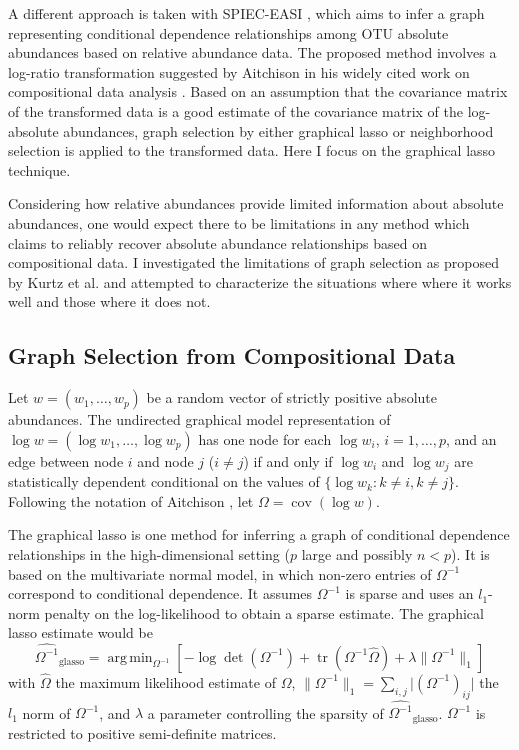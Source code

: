 \documentclass[10pt]{article}
\newcommand{\cov}{\operatorname{cov}}
\DeclareMathOperator*{\argmin}{arg\,min}
\DeclareMathOperator{\tr}{tr}
\begin{document}
A different approach is taken with SPIEC-EASI \cite{kurtz}, which aims to infer a graph representing conditional dependence relationships among OTU absolute abundances based on relative abundance data. The proposed method involves a log-ratio transformation suggested by Aitchison in his widely cited work on compositional data analysis \citeyear{aitchison}. Based on an assumption that the covariance matrix of the transformed data is a good estimate of the covariance matrix of the log-absolute abundances, graph selection by either graphical lasso or neighborhood selection is applied to the transformed data. Here I focus on the graphical lasso technique.

Considering how relative abundances provide limited information about absolute abundances, one would expect there to be limitations in any method which claims to reliably recover absolute abundance relationships based on compositional data. I investigated the limitations of graph selection as proposed by Kurtz et al. \citeyear{kurtz} and attempted to characterize the situations where where it works well and those where it does not.

\subsection*{Graph Selection from Compositional Data}

Let $w = (w_1, \dots, w_p)$ be a random vector of strictly positive absolute abundances. The undirected graphical model representation of $\log w = (\log w_1, \dots, \log w_p)$ has one node for each $\log w_i$, $i = 1, \dots, p$, and an edge between node $i$ and node $j$ ($i \ne j$) if and only if $\log w_i$ and $\log w_j$ are statistically dependent conditional on the values of $\{\log w_k : k \ne i, k \ne j\}$. Following the notation of Aitchison \citeyear{aitchison}, let $\Omega = \cov(\log w)$.

The graphical lasso \cite{friedmanjer} is one method for inferring a graph of conditional dependence relationships in the high-dimensional setting ($p$ large and possibly $n < p$). It is based on the multivariate normal model, in which non-zero entries of $\Omega^{-1}$ correspond to conditional dependence. It assumes $\Omega^{-1}$ is sparse and uses an $l_1$-norm penalty on the log-likelihood to obtain a sparse estimate. The graphical lasso estimate would be
\begin{equation}
\label{e:glasso}
\widehat{\Omega^{-1}}_{\text{glasso}} = \argmin_{\Omega^{-1}} \left[ -\log \det(\Omega^{-1}) + \tr(\Omega^{-1} \hat{\Omega}) + \lambda \lVert \Omega^{-1} \rVert_1 \right]
\end{equation}
with $\hat{\Omega}$ the maximum likelihood estimate of $\Omega$, $\lVert \Omega^{-1} \rVert_1 = \sum_{i,j} \lvert (\Omega^{-1})_{ij} \rvert$ the $l_1$ norm of $\Omega^{-1}$, and $\lambda$ a parameter controlling the sparsity of $\widehat{\Omega^{-1}}_{\text{glasso}}$. $\Omega^{-1}$ is restricted to positive semi-definite matrices.
\end{document}

